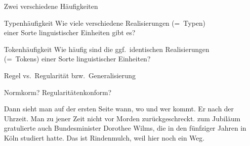 \begin{frame}
  {Zwei verschiedene Häufigkeiten}
  \pause
  \Large\begin{block}{Typenhäufigkeit}
    Wie viele \alert{verschiedene} Realisierungen (=~Typen)\\
    einer Sorte linguistischer Einheiten gibt es?
  \end{block}

  \pause
  \vspace{\baselineskip}
  
  \begin{block}{Tokenhäufigkeit}
    Wie häufig sind die \alert{ggf.\ identischen} Realisierungen\\
    (=~Tokens) einer Sorte linguistischer Einheiten?
  \end{block}
\end{frame}

\begin{frame}
  {Regel vs.\ Regularität bzw.\ Generalisierung}
  \pause
  \begin{exe}
    \ex
    \begin{xlist}
      \pause
      \pause
      \pause
      \pause
    \end{xlist}
  \end{exe}
\end{frame}


\begin{frame}
  {Normkorm? Regularitätenkonform?}
  \pause
  \begin{exe}
    \ex
    \begin{xlist}
      \ex Dann sieht man auf der ersten Seite \alert{wann, wo und wer}  kommt.
      \pause
      \ex Er  nach der Uhrzeit.
      \pause
      \ex Man  zu jener Zeit nicht vor Morden \alert{zurückgeschreckt}.
      \pause
      \ex {} \alert{zum Jubiläum} gratulierte auch Bundesminister Dorothee Wilms, die in den fünfziger Jahren in Köln studiert hatte.
      \pause
      \ex Das ist Rindenmulch, \alert{weil} hier  noch ein Weg.
    \end{xlist}
  \end{exe}
\end{frame}


